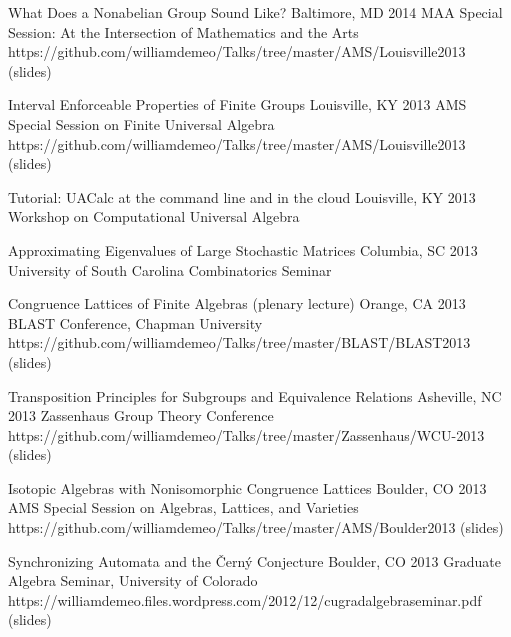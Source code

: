     \vspace{\vsp}

\talkurl
    {What Does a Nonabelian Group Sound Like?}
    {Baltimore, MD 2014}
    {MAA Special Session: At the Intersection of Mathematics and the Arts} 
    {https://github.com/williamdemeo/Talks/tree/master/AMS/Louisville2013}
    {(slides)}
    
    \vspace{\vsp}

\talkurl
    {Interval Enforceable Properties of Finite Groups}
    {Louisville, KY 2013} %
    {AMS Special Session on Finite Universal Algebra}
    {https://github.com/williamdemeo/Talks/tree/master/AMS/Louisville2013}
    {(slides)}

    \vspace{\vsp}

\talk
    {Tutorial: UACalc at the command line and in the cloud}
    {Louisville, KY 2013}
    {Workshop on Computational Universal Algebra} 

    \vspace{\vsp}

\talk
    {Approximating Eigenvalues of Large Stochastic Matrices}
    {Columbia, SC 2013}
    {University of South Carolina Combinatorics Seminar}  

    \vspace{\vsp}

\talkurl
    {Congruence Lattices of Finite Algebras (plenary lecture)}
    {Orange, CA 2013}
    {BLAST Conference, Chapman University} 
    {https://github.com/williamdemeo/Talks/tree/master/BLAST/BLAST2013}
    {(slides)}

    \vspace{\vsp}

\talkurl
    {Transposition Principles for Subgroups and Equivalence Relations}
    {Asheville, NC 2013} %
    {Zassenhaus Group Theory Conference}  
    {https://github.com/williamdemeo/Talks/tree/master/Zassenhaus/WCU-2013}
    {(slides)}

    \vspace{\vsp}

\talkurl
    {Isotopic Algebras with Nonisomorphic Congruence Lattices}
    {Boulder, CO 2013} %
    {AMS Special Session on Algebras, Lattices, and Varieties}  
    {https://github.com/williamdemeo/Talks/tree/master/AMS/Boulder2013}
    {(slides)}
    
    \vspace{\vsp}

\talkurl
    {Synchronizing Automata and the \v{C}ern\'{y} Conjecture}
    {Boulder, CO 2013}
    {Graduate Algebra Seminar, University of Colorado}
    {https://williamdemeo.files.wordpress.com/2012/12/cugradalgebraseminar.pdf}
    {(slides)}

    \vspace{\vsp}


